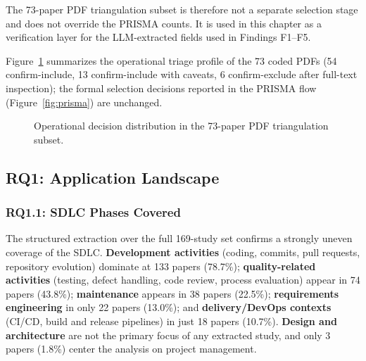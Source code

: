 The 73-paper PDF triangulation subset is therefore not a separate selection
stage and does not override the PRISMA counts. It is used in this chapter as
a verification layer for the LLM-extracted fields used in Findings F1--F5.

Figure~\ref{fig:pdf-decision-dist} summarizes the operational triage profile
of the 73 coded PDFs (54 confirm-include, 13 confirm-include with
caveats, 6 confirm-exclude after full-text inspection); the formal selection
decisions reported in the PRISMA flow (Figure~\ref{fig:prisma}) are
unchanged.

\begin{figure}[tbp]
\centering
{}
\caption{Operational decision distribution in the 73-paper PDF triangulation subset.}
\label{fig:pdf-decision-dist}
\end{figure}

\subsection{RQ1: Application Landscape}
\label{sec:slr-rq1}

\subsubsection{RQ1.1: SDLC Phases Covered}

The structured extraction over the full 169-study set confirms a strongly
uneven coverage of the SDLC. \textbf{Development activities} (coding,
commits, pull requests, repository evolution) dominate at 133 papers
(78.7\%); \textbf{quality-related activities} (testing, defect handling, code
review, process evaluation) appear in 74 papers (43.8\%);
\textbf{maintenance} appears in 38 papers (22.5\%);
\textbf{requirements engineering} in only 22 papers (13.0\%); and
\textbf{delivery/DevOps contexts} (CI/CD, build and release pipelines) in
just 18 papers (10.7\%). \textbf{Design and architecture} are not the primary
focus of any extracted study, and only 3 papers (1.8\%) center the analysis
on project management.

